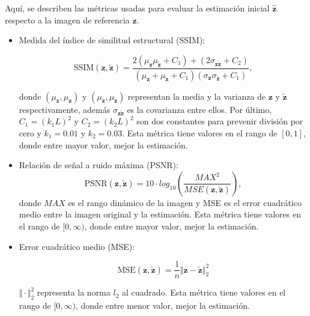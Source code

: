 Aquí, se describen las métricas usadas para evaluar la estimación inicial $\hat{\mathbf{z}}$ respecto a la imagen de referencia $\mathbf{z}$.
\begin{itemize}
    \item Medida del índice de similitud estructural (SSIM):
    
    \begin{equation}
        \mathrm{SSIM}(\mathbf{z}, \tilde{\mathbf{z}}) = \frac{2(\mu_{\mathbf{z}}\mu_{\tilde{\mathbf{z}}} + C_1) + (2\sigma_{\mathbf{z}\tilde{\mathbf{z}}} + C_2)}{(\mu_{\mathbf{z}} + \mu_{\tilde{\mathbf{z}}} + C_1)(\sigma_{\mathbf{z}}\sigma_{\tilde{\mathbf{z}}} + C_1)},
        \label{eq:SSIM}
    \end{equation}
    
    donde $(\mu_{\mathbf{z}}, \mu_{{\mathbf{z}}})$ y $(\mu_{\tilde{\mathbf{z}}}, \mu_{\tilde{\mathbf{z}}})$ representan la media y la varianza de ${\mathbf{z}}$ y $\tilde{\mathbf{z}}$ respectivamente, además $\sigma_{\mathbf{z}\tilde{\mathbf{z}}}$ es la covarianza entre ellos. Por último, $C_1 = (k_1L)^2$ y $C_2 = (k_2L)^2$ son dos constantes para prevenir división por cero y $k_1 = 0.01$ y $k_2 = 0.03$. Esta métrica tiene valores en el rango de $[0, 1]$, donde entre mayor valor, mejor la estimación.
    
    \item Relación de señal a ruido máxima (PSNR):
    \begin{equation}
        \mathrm{PSNR}(\mathbf{z}, \tilde{\mathbf{z}})=10 \cdot log_{10}\left(\frac{MAX^{2}}{MSE(\mathbf{z}, \tilde{\mathbf{z}})}\right),
        \label{eq:PSNR}
    \end{equation}
    donde $MAX$ es el rango dinámico de la imagen y MSE es el error cuadrático medio entre la imagen original y la estimación. Esta métrica tiene valores en el rango de $[0, \infty)$, donde entre mayor valor, mejor la estimación.
    
    \item Error cuadrático medio (MSE):
    
    \begin{equation}
        \mathrm{MSE}(\mathbf{z}, \tilde{\mathbf{z}}) = \frac{1}{n} \Vert \mathbf{z} - \tilde{\mathbf{z}}\Vert_2^2
        \label{eq:MSE}
    \end{equation}
    
    $\Vert \cdot \Vert_2^2$ representa la norma $l_2$ al cuadrado. Esta métrica tiene valores en el rango de $[0, \infty)$, donde entre menor valor, mejor la estimación.


\end{itemize}
